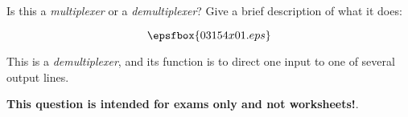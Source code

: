 

Is this a {\it multiplexer} or a {\it demultiplexer}?  Give a brief description of what it does:

$$\epsfbox{03154x01.eps}$$







This is a {\it demultiplexer}, and its function is to direct one input to one of several output lines.







{\bf This question is intended for exams only and not worksheets!}.





